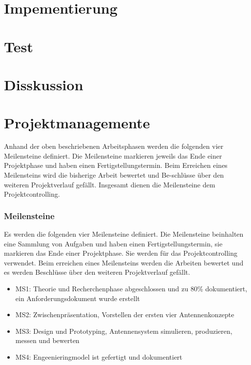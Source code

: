 \newpage
\section{Impementierung}
\section{Test}
\section{Disskussion}
\section{Projektmanagemente}
Anhand der oben beschriebenen Arbeitsphasen werden die folgenden vier Meilensteine definiert. Die Meilensteine markieren jeweils das Ende einer Projektphase und haben einen Fertigstellungstermin. Beim Erreichen eines Meilensteins wird die bisherige Arbeit bewertet und Be-schlüsse über den weiteren Projektverlauf gefällt. Insgesamt dienen die Meilensteine dem Projektcontrolling.
\subsubsection{Meilensteine}
Es werden die folgenden vier Meilensteine definiert. Die Meilensteine
beinhalten   eine Sammlung von Aufgaben und haben einen
Fertigstellungstermin, sie markieren das Ende einer Projektphase. Sie
werden für das Projektcontrolling verwendet. Beim erreichen eines Meilensteins werden die Arbeiten bewertet und es werden Beschlüsse über den weiteren Projektverlauf gefällt.
	\begin{itemize}
		\item MS1: Theorie und Recherchenphase abgeschlossen und zu 80\% dokumentiert, ein Anforderungsdokument wurde erstellt
		\item MS2: Zwischenpräsentation, Vorstellen der ersten vier Antennenkonzepte
		\item MS3: Design und Prototyping, Antennensystem simulieren, produzieren, messen und bewerten
		\item MS4: Engeenieringmodel ist gefertigt und dokumentiert
	\end{itemize}

\newpage
\begin{thebibliography}{mustermarke}
\end{thebibliography}
